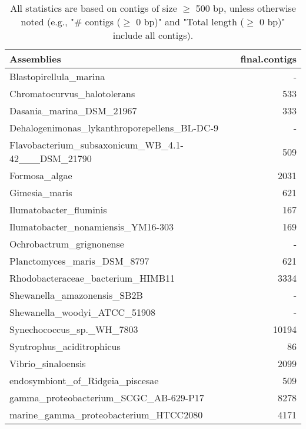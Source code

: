 \documentclass[12pt,a4paper]{article}
\begin{document}
\begin{table}[ht]
\begin{center}
\caption{All statistics are based on contigs of size $\geq$ 500 bp, unless otherwise noted (e.g., "\# contigs ($\geq$ 0 bp)" and "Total length ($\geq$ 0 bp)" include all contigs).}
\begin{tabular}{|l*{1}{|r}|}
\hline
Assemblies & final.contigs \\ \hline
Blastopirellula\_marina & - \\ \hline
Chromatocurvus\_halotolerans & 533 \\ \hline
Dasania\_marina\_DSM\_21967 & 333 \\ \hline
Dehalogenimonas\_lykanthroporepellens\_BL-DC-9 & - \\ \hline
Flavobacterium\_subsaxonicum\_WB\_4.1-42\_\_\_DSM\_21790 & 509 \\ \hline
Formosa\_algae & 2031 \\ \hline
Gimesia\_maris & 621 \\ \hline
Ilumatobacter\_fluminis & 167 \\ \hline
Ilumatobacter\_nonamiensis\_YM16-303 & 169 \\ \hline
Ochrobactrum\_grignonense & - \\ \hline
Planctomyces\_maris\_DSM\_8797 & 621 \\ \hline
Rhodobacteraceae\_bacterium\_HIMB11 & 3334 \\ \hline
Shewanella\_amazonensis\_SB2B & - \\ \hline
Shewanella\_woodyi\_ATCC\_51908 & - \\ \hline
Synechococcus\_sp.\_WH\_7803 & 10194 \\ \hline
Syntrophus\_aciditrophicus & 86 \\ \hline
Vibrio\_sinaloensis & 2099 \\ \hline
endosymbiont\_of\_Ridgeia\_piscesae & 509 \\ \hline
gamma\_proteobacterium\_SCGC\_AB-629-P17 & 8278 \\ \hline
marine\_gamma\_proteobacterium\_HTCC2080 & 4171 \\ \hline
\end{tabular}
\end{center}
\end{table}
\end{document}
